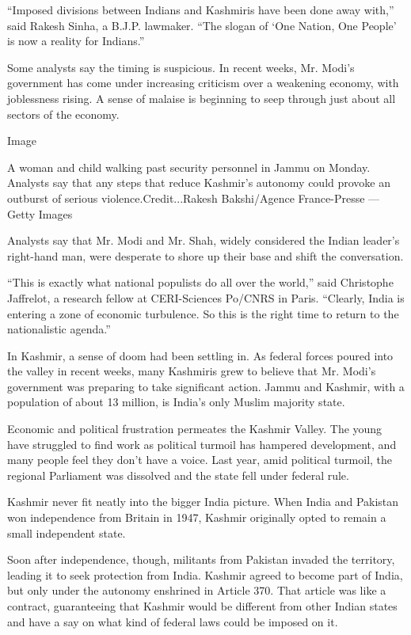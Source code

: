 ``Imposed divisions between Indians and Kashmiris have been done away
with,'' said Rakesh Sinha, a B.J.P. lawmaker. ``The slogan of `One
Nation, One People' is now a reality for Indians.''

Some analysts say the timing is suspicious. In recent weeks, Mr. Modi's
government has come under increasing criticism over a weakening economy,
with joblessness rising. A sense of malaise is beginning to seep through
just about all sectors of the economy.

Image

A woman and child walking past security personnel in Jammu on Monday.
Analysts say that any steps that reduce Kashmir's autonomy could provoke
an outburst of serious violence.Credit...Rakesh Bakshi/Agence
France-Presse --- Getty Images

Analysts say that Mr. Modi and Mr. Shah, widely considered the Indian
leader's right-hand man, were desperate to shore up their base and shift
the conversation.

``This is exactly what national populists do all over the world,'' said
Christophe Jaffrelot, a research fellow at CERI-Sciences Po/CNRS in
Paris. ``Clearly, India is entering a zone of economic turbulence. So
this is the right time to return to the nationalistic agenda.''

In Kashmir, a sense of doom had been settling in. As federal forces
poured into the valley in recent weeks, many Kashmiris grew to believe
that Mr. Modi's government was preparing to take significant action.
Jammu and Kashmir, with a population of about 13 million, is India's
only Muslim majority state.

Economic and political frustration permeates the Kashmir Valley. The
young have struggled to find work as political turmoil has hampered
development, and many people feel they don't have a voice. Last year,
amid political turmoil, the regional Parliament was dissolved and the
state fell under federal rule.

Kashmir never fit neatly into the bigger India picture. When India and
Pakistan won independence from Britain in 1947, Kashmir originally opted
to remain a small independent state.

Soon after independence, though, militants from Pakistan invaded the
territory, leading it to seek protection from India. Kashmir agreed to
become part of India, but only under the autonomy enshrined in Article
370. That article was like a contract, guaranteeing that Kashmir would
be different from other Indian states and have a say on what kind of
federal laws could be imposed on it.

